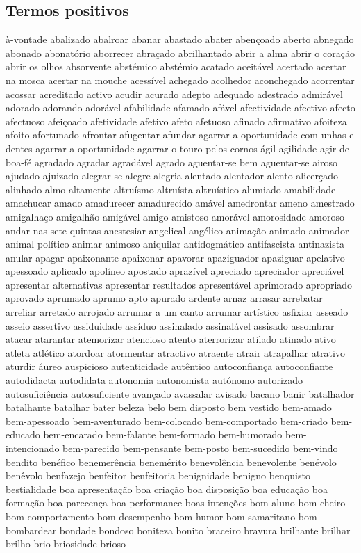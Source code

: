 \documentclass[ruledheader]{abnt_UFF}
\begin{document}
\subsection{Termos positivos}
\`{a}-vontade abalizado abalroar abanar abastado abater aben\c{c}oado aberto abnegado abonado abonat\'{o}rio aborrecer abra\c{c}ado abrilhantado abrir a alma abrir o cora\c{c}\~ao abrir os olhos absorvente abst\'{e}mico abst\'{e}mio acatado aceit\'{a}vel acertado acertar na mosca acertar na mouche acess\'{i}vel achegado acolhedor aconchegado acorrentar acossar acreditado activo acudir acurado adepto adequado adestrado admir\'{a}vel adorado adorando ador\'{a}vel afabilidade afamado af\'{a}vel afectividade afectivo afecto afectuoso afei\c{c}oado afetividade afetivo afeto afetuoso afinado afirmativo afoiteza afoito afortunado afrontar afugentar afundar agarrar a oportunidade com unhas e dentes agarrar a oportunidade agarrar o touro pelos cornos \'{a}gil agilidade agir de boa-f\'{e} agradado agradar agrad\'{a}vel agrado aguentar-se bem aguentar-se airoso ajudado ajuizado alegrar-se alegre alegria alentado alentador alento alicer\c{c}ado alinhado almo altamente altru\'{i}smo altru\'{i}sta altru\'{i}stico alumiado amabilidade amachucar amado amadurecer amadurecido am\'{a}vel amedrontar ameno amestrado amigalha\c{c}o amigalh\~ao amig\'{a}vel amigo amistoso amor\'{a}vel amorosidade amoroso andar nas sete quintas anestesiar angelical ang\'{e}lico anima\c{c}\~ao animado animador animal pol\'{i}tico animar animoso aniquilar antidogm\'{a}tico antifascista antinazista anular apagar apaixonante apaixonar apavorar apaziguador apaziguar apelativo apessoado aplicado apol\'{i}neo apostado apraz\'{i}vel apreciado apreciador apreci\'{a}vel apresentar alternativas apresentar resultados apresent\'{a}vel aprimorado apropriado aprovado aprumado aprumo apto apurado ardente arnaz arrasar arrebatar arreliar arretado arrojado arrumar a um canto arrumar art\'{i}stico asfixiar asseado asseio assertivo assiduidade ass\'{i}duo assinalado assinal\'{a}vel assisado assombrar atacar atarantar atemorizar atencioso atento aterrorizar atilado atinado ativo atleta atl\'{e}tico atordoar atormentar atractivo atraente atrair atrapalhar atrativo aturdir \'{a}ureo auspicioso autenticidade aut\^{e}ntico autoconfian\c{c}a autoconfiante autodidacta autodidata autonomia autonomista aut\'{o}nomo autorizado autosufici\^{e}ncia autosuficiente avan\c{c}ado avassalar avisado bacano banir batalhador batalhante batalhar bater beleza belo bem disposto bem vestido bem-amado bem-apessoado bem-aventurado bem-colocado bem-comportado bem-criado bem-educado bem-encarado bem-falante bem-formado bem-humorado bem-intencionado bem-parecido bem-pensante bem-posto bem-sucedido bem-vindo bendito ben\'{e}fico benemer\^{e}ncia benem\'{e}rito benevol\^{e}ncia benevolente ben\'{e}volo ben\^{e}volo benfazejo benfeitor benfeitoria benignidade benigno benquisto bestialidade boa apresenta\c{c}\~ao boa cria\c{c}\~ao boa disposi\c{c}\~ao boa educa\c{c}\~ao boa forma\c{c}\~ao boa parecen\c{c}a boa performance boas inten\c{c}\~oes bom aluno bom cheiro bom comportamento bom desempenho bom humor bom-samaritano bom bombardear bondade bondoso boniteza bonito braceiro bravura brilhante brilhar brilho brio briosidade brioso 
\end{document}
